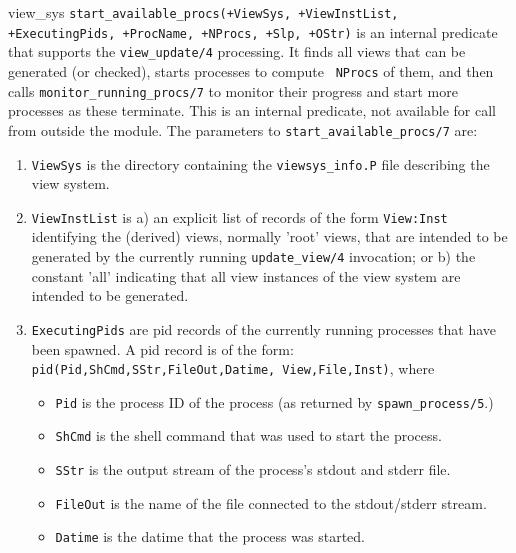 \begin{description}
{view\_sys}
{\tt start\_available\_procs(+ViewSys, +ViewInstList, +ExecutingPids,
  +ProcName, +NProcs, +Slp, +OStr)} is an internal predicate that
supports the {\tt view\_update/4} processing.  It finds all views that
can be generated (or checked), starts processes to compute {\tt
  NProcs} of them, and then calls {\tt monitor\_running\_procs/7} to
monitor their progress and start more processes as these terminate.
This is an internal predicate, not available for call from outside the
module. The parameters to {\tt start\_available\_procs/7} are:

\begin{enumerate}

\item {\tt ViewSys} is the directory containing the
{\tt viewsys\_info.P} file describing the view system.

\item {\tt ViewInstList} is a) an explicit list of records of the form
{\tt View:Inst} identifying the (derived) views, normally 'root'
views, that are intended to be generated by the currently running
{\tt update\_view/4} invocation; or b) the constant 'all' indicating
that all view instances of the view system are intended to be
generated.

\item {\tt ExecutingPids} are pid records of the currently running
processes that have been spawned.  A pid record is of the form:
{\tt pid(Pid,ShCmd,SStr,FileOut,Datime, \linebreak[2] View,File,Inst)}, where

\begin{itemize}

\item {\tt Pid} is the process ID of the process (as returned by
{\tt spawn\_process/5}.)

\item {\tt ShCmd} is the shell command that was used to start the process.

\item {\tt SStr} is the output stream of the process's stdout and stderr file.

\item {\tt FileOut} is the name of the file connected to the stdout/stderr stream.

\item {\tt Datime} is the datime that the process was started.


\end{itemize}
\end{enumerate}
\end{description}
